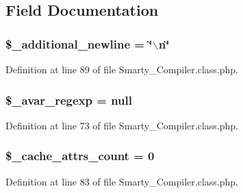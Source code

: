 \subsection{\-Field \-Documentation}
\hypertarget{class_smarty___compiler_a3e4ba555ca784bb698e8f909289743a5}{
\subsubsection[{\$\-\_\-additional\-\_\-newline}]{\setlength{\rightskip}{0pt plus 5cm}\$\-\_\-additional\-\_\-newline = \char`\"{}$\backslash$n\char`\"{}}}\label{class_smarty___compiler_a3e4ba555ca784bb698e8f909289743a5}


\-Definition at line 89 of file \-Smarty\-\_\-\-Compiler.\-class.\-php.

\hypertarget{class_smarty___compiler_a9ad31b4f1def32f9f0ef821dd61eb189}{
\subsubsection[{\$\-\_\-avar\-\_\-regexp}]{\setlength{\rightskip}{0pt plus 5cm}\$\-\_\-avar\-\_\-regexp = null}}\label{class_smarty___compiler_a9ad31b4f1def32f9f0ef821dd61eb189}


\-Definition at line 73 of file \-Smarty\-\_\-\-Compiler.\-class.\-php.

\hypertarget{class_smarty___compiler_a3b268966abebb908a137a87d0e83f4a1}{
\subsubsection[{\$\-\_\-cache\-\_\-attrs\-\_\-count}]{\setlength{\rightskip}{0pt plus 5cm}\$\-\_\-cache\-\_\-attrs\-\_\-count = 0}}\label{class_smarty___compiler_a3b268966abebb908a137a87d0e83f4a1}


\-Definition at line 83 of file \-Smarty\-\_\-\-Compiler.\-class.\-php.

